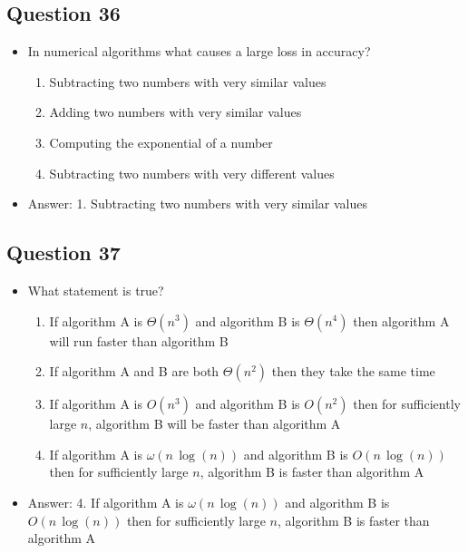 \begin{slide}
\section[-1]{Question 36}

\begin{PauseHighLight}
  \begin{itemize}
  \item In numerical algorithms what causes a large loss in accuracy?
    \begin{enumerate}
    \item Subtracting two numbers with very similar values
    \item Adding two numbers with very similar values
    \item Computing the exponential of a number
    \item Subtracting two numbers with very different values\pause
    \end{enumerate}
  \item Answer: 1. Subtracting two numbers with very similar values\pauseb
  \end{itemize}
\end{PauseHighLight}
\end{slide}

\begin{slide}
\section[-1]{Question 37}

\begin{PauseHighLight}
  \begin{itemize}
  \item What statement is true?
    \begin{enumerate}
    \item If algorithm A is $\Theta(n^3)$ and algorithm B is $\Theta(n^4)$ then algorithm A will run faster than algorithm B
    \item If algorithm A and B are both $\Theta(n^2)$ then they take the same time
    \item If algorithm A is $O(n^3)$ and algorithm B is $O(n^2)$ then for sufficiently large $n$, algorithm B will be faster than algorithm A
    \item If algorithm A is $\omega(n\,\log(n))$ and algorithm B is $O(n\,\log(n))$ then for sufficiently large $n$, algorithm B is faster than algorithm A\pause
    \end{enumerate}
  \item Answer: 4. If algorithm A is $\omega(n\,\log(n))$ and algorithm B is $O(n\,\log(n))$ then for sufficiently large $n$, algorithm B is faster than algorithm A\pauseb
  \end{itemize}
\end{PauseHighLight}
\end{slide}

